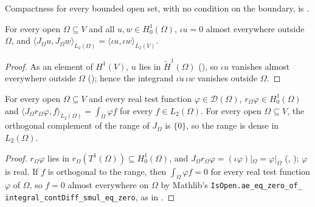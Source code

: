 Compactness for every bounded open set, with no condition on the boundary, is
\cite[Theorem~9.16 and Remark~20, pp.~285 and~290]{Brezis2011}.

\begin{lemma}
\label{lem:dirichlet-l2-inner}
\leanok
{}
For every open $\Omega \subseteq V$ and all $u, w \in H^1_0(\Omega)$, $\iota u = 0$ almost
everywhere outside $\Omega$, and
$\langle J_\Omega u, J_\Omega w \rangle_{L_2(\Omega)} = \langle \iota u, \iota w \rangle_{L_2(V)}$.
\end{lemma}

\begin{proof}
\leanok
As an element of $H^1(V)$, $u$ lies in $\tilde H^1(\Omega)$
(), so $\iota u$ vanishes almost everywhere outside
$\Omega$ (); hence the integrand
$\overline{\iota u}\, \iota w$ vanishes outside $\Omega$.
\end{proof}

\begin{lemma}
\label{lem:dirichlet-dense}
\leanok
{}
For every open $\Omega \subseteq V$ and every real test function $\varphi \in \mathcal D(\Omega)$,
$r_\Omega \varphi \in H^1_0(\Omega)$ and
$\langle J_\Omega r_\Omega \varphi, f \rangle_{L_2(\Omega)} = \int_\Omega \varphi f$ for every
$f \in L_2(\Omega)$. For every open $\Omega \subseteq V$, the orthogonal complement of the range
of $J_\Omega$ is $\{0\}$, so the range is dense in $L_2(\Omega)$.
\end{lemma}

\begin{proof}
\leanok
$r_\Omega \varphi$ lies in $r_\Omega(T^1(\Omega)) \subseteq H^1_0(\Omega)$, and
$J_\Omega r_\Omega \varphi = (\iota \varphi)|_\Omega = \varphi|_\Omega$
(, ); $\varphi$ is real.
If $f$ is orthogonal to the range, then $\int_\Omega \varphi f = 0$ for every real test function
$\varphi$ of $\Omega$, so $f = 0$ almost everywhere on $\Omega$ by Mathlib's
\texttt{IsOpen.\allowbreak ae\_\allowbreak eq\_\allowbreak zero\_\allowbreak of\_\allowbreak
integral\_\allowbreak contDiff\_\allowbreak smul\_\allowbreak eq\_\allowbreak zero}, as in
.
\end{proof}

